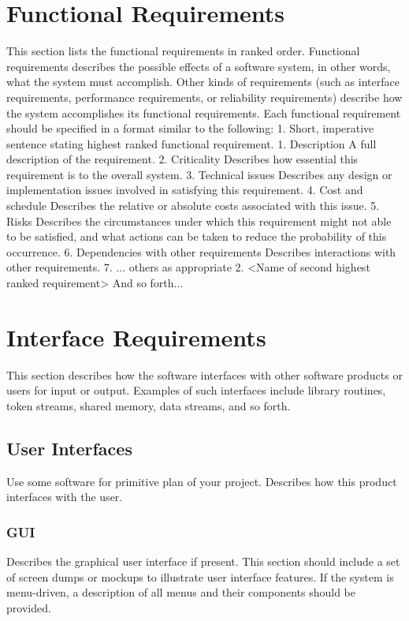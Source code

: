 \documentclass[]{article}
\begin{document}
\section{Functional Requirements}
This section lists the functional requirements in ranked order. Functional requirements describes the possible effects of a software system, in other words, what the system must accomplish. Other kinds of requirements (such as interface requirements, performance requirements, or reliability requirements) describe how the system accomplishes its functional requirements. Each functional requirement should be specified in a format similar to the following: 
1.	Short, imperative sentence stating highest ranked functional requirement.
1.	Description
A full description of the requirement. 
2.	Criticality
Describes how essential this requirement is to the overall system. 
3.	Technical issues
Describes any design or implementation issues involved in satisfying this requirement. 
4.	Cost and schedule
Describes the relative or absolute costs associated with this issue. 
5.	Risks
Describes the circumstances under which this requirement might not able to be satisfied, and what actions can be taken to reduce the probability of this occurrence. 
6.	Dependencies with other requirements
Describes interactions with other requirements. 
7.	... others as appropriate
2.	<Name of second highest ranked requirement>
And so forth... 

\section{Interface Requirements}
This section describes how the software interfaces with other software products or users for input or output. Examples of such interfaces include library routines, token streams, shared memory, data streams, and so forth. 

\subsection{User Interfaces}
Use some software for primitive plan of your project.
Describes how this product interfaces with the user. 

\subsubsection {GUI}
Describes the graphical user interface if present. This section should include a set of screen dumps or mockups to illustrate user interface features. 
If the system is menu-driven, a description of all menus and their components should be provided. 
\end{document}
